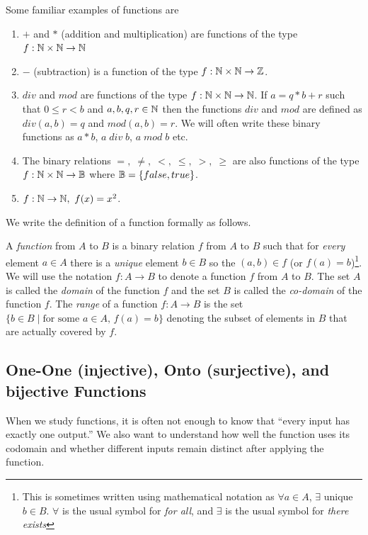 Some familiar examples of functions are 
\begin{enumerate}
\item   $+$ and $*$ (addition and multiplication) are functions of the type
        $f: \mathbb{N} \times \mathbb{N} \rightarrow \mathbb{N}$ 
\item   $-$ (subtraction) is a function of the type $f: \mathbb{N} \times \mathbb{N} \rightarrow
 \mathbb{Z}$.
\item   $div$ and $mod$ are functions of the type $f: \mathbb{N} \times \mathbb{N} \rightarrow \mathbb{N}$.
        If $a = q*b + r$ such that $0 \leq r < b$ and $a,b,q,r \in \mathbb{N}$ then
        the functions $div$ and $mod$ are defined as $div(a,b) = q$ and
        $mod(a,b) = r$. We will often write these binary functions as
        $a * b$, $a\; div \;b$, $a \; mod \; b$ etc.
\item   The binary relations $=,\;\neq,\;<,\;\leq,\;>,\;\geq$ are also functions of the type
        $f: \mathbb{N} \times \mathbb{N} \rightarrow \mathbb{B}$        where $\mathbb{B} = \{false,true\}$.
\item $f:\mathbb{N}\to\mathbb{N},\ f(x)=x^2$.
\end{enumerate}


We write the definition of a function formally as follows.

A {\em function} from $A$ to $B$ is a binary relation $f$ from $A$ to $B$ such
that for {\em every} element $a \in A$ there is a {\em unique} element
$b \in B$ so the $(a,b) \in f$ (or $f(a) = b$)\footnote{This is sometimes written using mathematical notation as $\forall a \in A$, $\exists$ unique $b \in B$. $\forall$ is the usual symbol for {\em for all}, and $\exists$ is the usual symbol for {\em there exists}}. We will use the notation 
$f: A \rightarrow B$
to denote a function $f$ from $A$ to $B$. The set $A$ is called the 
{\em domain} of the function $f$ and the set $B$ is called the {\em co-domain}
of the function $f$. The {\em range} of a function $f: A \rightarrow B$ is the
set $\{b \in B \mid \mbox{for some $a \in A$, $f(a) = b$}\}$ denoting the subset of elements in $B$ that are actually covered by $f$. 


\subsection{One-One (injective), Onto (surjective), and bijective Functions}
When we study functions, it is often not enough to know that “every input has exactly one output.”
We also want to understand how well the function uses its codomain and whether different inputs remain distinct after applying the function.

